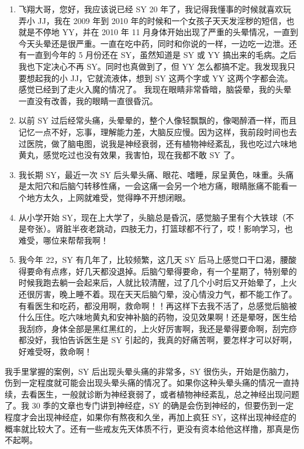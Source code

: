 \documentclass[fontset=founder]{ctexart}
\begin{document}
\begin{enumerate}
    \item 飞翔大哥，您好，我应该说已经 SY 20 年了，我记得我懂事的时候就喜欢玩弄小 JJ，我在 2009 年到 2010 年的时候和一个女孩子天天发淫秽的短信，也就是不停地 YY，并在 2010 年 11 月身体开始出现了严重的头晕情况，一直到今天头晕还是很严重。一直在吃中药，同时和你说的一样，一边吃一边泄。还有一直到今年的 5 月份还在 SY，虽然知道是 SY 或 YY 搞出来的毛病。之后我也下定决心不再 SY。同时也真做到了，但 YY 怎么都搞不定。我发现我只要想起我的小 JJ，它就流液体，想到 SY 这两个字或 YY 这两个字都会流。感觉已经到了走火入魔的情况了。 我现在眼睛非常昏暗，脑袋晕，我的头晕一直没有改善，我的眼睛一直很昏沉。
    \item 以前 SY 过后经常头痛，头晕晕的，整个人像轻飘飘的，像喝醉酒一样，而且记忆一点不好，忘事，理解能力差，大脑反应慢。因为这样，我前段时间也去过医院，做了脑电图，说我是神经衰弱，还有植物神经紊乱，我也吃过六味地黄丸，感觉吃过也没有效果，我害怕，现在我都不敢 SY 了。
    \item 我长期 SY，最近一次 SY 后头晕头痛、眼花、嗜睡，尿呈黄色，味重。头痛是太阳穴和后脑勺转移性痛，一会这痛一会另一个地方痛，眼睛胀痛不能看一个地方太久，上网就难受，觉得睁不开想闭眼。
    \item 从小学开始 SY，现在上大学了，头脑总是昏沉，感觉脑子里有个大铁球（不是夸张）。肾脏半夜老跳动，四肢无力，打篮球都不行了，哎！影响学习，也难受，哪位来帮帮我啊！
    \item 我今年 22，SY 有几年了，比较频繁，这几天 SY 后马上感觉口干口渴，腰酸得要命有点疼，好几天都没退掉。后脑勺晕得要命，有一个星期了，特别晕的时候我跑去躺一会起来后，人就比较清醒，过了几个小时后又开始晕了，上火还很厉害，晚上睡不着。现在天天后脑勺晕，没心情没力气，都不能工作了。有看医生和吃药，都没用啊，救命啊！！再这样下去我不活了，总感觉后脑被什么压住。吃六味地黄丸和安神补脑的药物，没见效果啊！还是晕呀，医生给我刮痧，身体全部是黑红黑红的，上火好厉害啊，我还是晕得要命啊，刮完痧都没好，我怕告诉医生是 SY 引起的，我真的好痛苦啊，要怎样才可以好啊，好难受呀，救命啊！
\end{enumerate}

我手里掌握的案例，SY 后出现头晕头痛的非常多，SY 很伤头，开始是伤脑力，伤到一定程度就可能会出现头晕头痛的情况了。如果你这种头晕头痛的情况一直持续，去看医生，一般就诊断为神经衰弱了，或者植物神经紊乱，总之神经出现问题了。我 30 季的文章也专门讲到神经症，SY 的确是会伤到神经的，但要伤到一定程度才会出现神经症，如果你有熬夜和久坐，再加上疯狂 SY，这样出现神经症的概率就比较大了。还有一些戒友先天体质不行，更没有资本给他这样撸，那真是伤不起啊。
\end{document}

